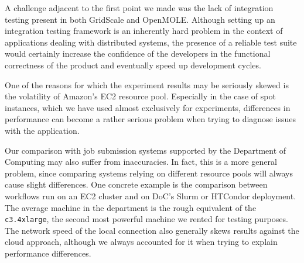 A challenge adjacent to the first point we made was the lack of integration testing present in both GridScale and OpenMOLE. Although setting up an integration testing framework is an inherently hard problem in the context of applications dealing with distributed systems, the presence of a reliable test suite would certainly increase the confidence of the developers in the functional correctness of the product and eventually speed up development cycles.

One of the reasons for which the experiment results may be seriously skewed is the volatility of Amazon's EC2 resource pool. Especially in the case of spot instances, which we have used almost exclusively for experiments, differences in performance can become a rather serious problem when trying to diagnose issues with the application.

Our comparison with job submission systems supported by the Department of Computing may also suffer from inaccuracies. In fact, this is a more general problem, since comparing systems relying on different resource pools will always cause slight differences. One concrete example is the comparison between workflows run on an EC2 cluster and on DoC's Slurm or HTCondor deployment. The average machine in the department is the rough equivalent of the \verb|c3.4xlarge|, the second most powerful machine we rented for testing purposes. The network speed of the local connection also generally skews results against the cloud approach, although we always accounted for it when trying to explain performance differences.